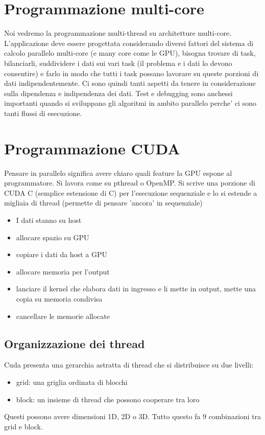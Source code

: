 \section{Programmazione multi-core}
Noi vedremo la programmazione multi-thread su architetture multi-core. L'applicazione deve essere progettata considerando diversi fattori del sistema di calcolo parallelo multi-core (e many core come le GPU), bisogna trovare di task, bilanciarli, suddividere i dati sui vari task (il problema e i dati lo devono consentire) e farlo in modo che tutti i task possano lavorare su queste porzioni di dati indipendentemente. Ci sono quindi tanti aspetti da tenere in considerazione sulla dipendenza e indipendenza dei dati. Test e debugging sono anchessi importanti quando si sviluppano gli algoritmi in ambito parallelo perche' ci sono tanti flussi di esecuzione.

\section{Programmazione CUDA}
Pensare in parallelo significa avere chiaro quali feature la GPU espone al programmatore. Si lavora come su pthread o OpenMP. Si scrive una porzione di CUDA C (semplice estensione di C) per l'esecuzione sequenziale e lo si estende a migliaia di thread (permette di pensare 'ancora' in sequenziale)

\begin{itemize}
    \item I dati stanno su host
    \item allocare spazio su GPU
    \item copiare i dati da host a GPU
    \item allocare memoria per l'output
    \item lanciare il kernel che elabora dati in ingresso e li mette in output, mette una copia su memoria condivisa
    \item cancellare le memorie allocate
\end{itemize}

\subsection{Organizzazione dei thread}
Cuda presenta una gerarchia astratta di thread che si distribuisce su due livelli:
\begin{itemize}
    \item grid: una griglia ordinata di blocchi
    \item block: un insieme di thread che possono cooperare tra loro
\end{itemize}
Questi possono avere dimensioni 1D, 2D o 3D. Tutto questo fa 9 combinazioni tra grid e block.

